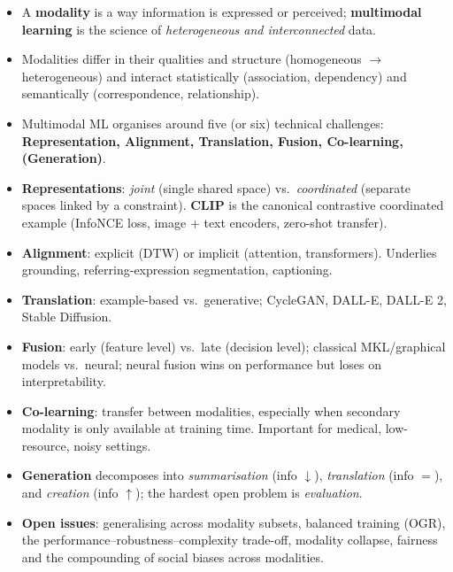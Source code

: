 \documentclass[11pt,a4paper]{article}
\theoremstyle{definition}
\theoremstyle{plain}
\theoremstyle{remark}
\begin{document}
\begin{tcolorbox}[colback=yellow!5!white,colframe=orange!80!black,title=\textbf{Take-Home Messages}]
\begin{itemize}[leftmargin=*]
    \item A \textbf{modality} is a way information is expressed or perceived; \textbf{multimodal learning} is the science of \emph{heterogeneous and interconnected} data.
    \item Modalities differ in their qualities and structure (homogeneous $\to$ heterogeneous) and interact statistically (association, dependency) and semantically (correspondence, relationship).
    \item Multimodal ML organises around five (or six) technical challenges: \textbf{Representation, Alignment, Translation, Fusion, Co-learning, (Generation)}.
    \item \textbf{Representations}: \emph{joint} (single shared space) vs.\ \emph{coordinated} (separate spaces linked by a constraint). \textbf{CLIP} is the canonical contrastive coordinated example (InfoNCE loss, image + text encoders, zero-shot transfer).
    \item \textbf{Alignment}: explicit (DTW) or implicit (attention, transformers). Underlies grounding, referring-expression segmentation, captioning.
    \item \textbf{Translation}: example-based vs.\ generative; CycleGAN, DALL-E, DALL-E 2, Stable Diffusion.
    \item \textbf{Fusion}: early (feature level) vs.\ late (decision level); classical MKL/graphical models vs.\ neural; neural fusion wins on performance but loses on interpretability.
    \item \textbf{Co-learning}: transfer between modalities, especially when secondary modality is only available at training time. Important for medical, low-resource, noisy settings.
    \item \textbf{Generation} decomposes into \emph{summarisation} (info $\downarrow$), \emph{translation} (info $=$), and \emph{creation} (info $\uparrow$); the hardest open problem is \emph{evaluation}.
    \item \textbf{Open issues}: generalising across modality subsets, balanced training (OGR), the performance--robustness--complexity trade-off, modality collapse, fairness and the compounding of social biases across modalities.
\end{itemize}
\end{tcolorbox}
\end{document}
